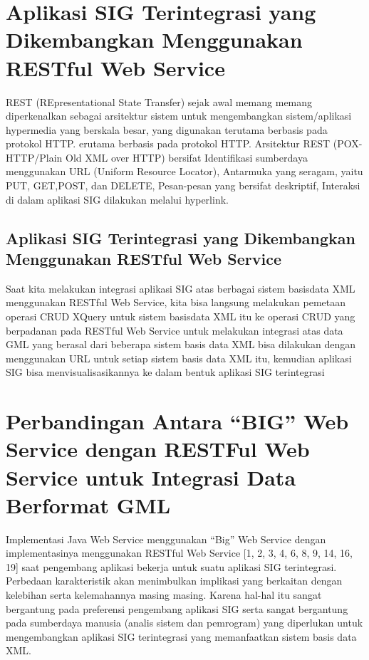 \documentclass[12pt,a4paper]{article}
\begin{document}
\section{Aplikasi SIG Terintegrasi yang Dikembangkan Menggunakan RESTful Web Service}
REST (REpresentational State Transfer) sejak awal memang memang diperkenalkan sebagai arsitektur sistem untuk mengembangkan sistem/aplikasi hypermedia yang berskala besar, yang digunakan terutama berbasis pada protokol HTTP. erutama berbasis pada protokol HTTP. Arsitektur REST (POX-HTTP/Plain Old XML over HTTP) bersifat Identifikasi sumberdaya menggunakan URL
(Uniform Resource Locator), Antarmuka yang seragam, yaitu PUT, GET,POST, dan DELETE, Pesan-pesan yang bersifat deskriptif, Interaksi di dalam aplikasi SIG dilakukan melalui hyperlink.
\subsection{Aplikasi SIG Terintegrasi yang Dikembangkan Menggunakan RESTful Web Service}
Saat kita melakukan integrasi aplikasi SIG atas berbagai sistem basisdata XML menggunakan RESTful Web Service, kita bisa langsung melakukan pemetaan operasi CRUD XQuery untuk sistem basisdata XML itu ke operasi CRUD yang berpadanan pada RESTful Web Service 
untuk melakukan integrasi atas data GML yang berasal dari beberapa sistem basis data XML bisa dilakukan dengan menggunakan URL untuk setiap sistem basis data XML itu, kemudian aplikasi SIG bisa menvisualisasikannya ke dalam bentuk aplikasi SIG terintegrasi


\section{Perbandingan Antara “BIG” Web Service dengan RESTFul Web Service untuk Integrasi Data Berformat GML}
Implementasi Java Web Service menggunakan “Big” Web Service dengan implementasinya menggunakan RESTful Web Service [1, 2, 3, 4, 6, 8, 9, 14, 16, 19] saat pengembang aplikasi bekerja untuk suatu aplikasi SIG terintegrasi. Perbedaan karakteristik akan menimbulkan implikasi yang berkaitan dengan kelebihan serta kelemahannya masing masing. Karena hal-hal itu sangat bergantung pada preferensi pengembang aplikasi SIG serta sangat bergantung pada sumberdaya manusia (analis sistem dan pemrogram) yang diperlukan untuk mengembangkan aplikasi SIG terintegrasi yang memanfaatkan sistem basis data XML.
\end{document}
